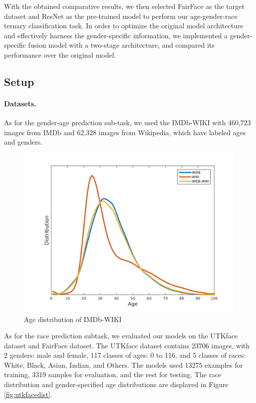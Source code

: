 \documentclass[DIV=calc, paper=a4, fontsize=10pt, twocolumn]{article}
\begin{document}
	
	With the obtained comparative results, we then selected FairFace as the target dataset and ResNet as the pre-trained model to perform our age-gender-race ternary classification task. In order to optimize the original model architecture and effectively harness the gender-specific information, we implemented a gender-specific fusion model with a two-stage architecture, and compared its performance over the original model.
	
	
	\subsection{Setup} \label{setup}
	
	\paragraph{Datasets.} As for the gender-age prediction sub-task, we used the IMDb-WIKI\cite{Rothe-IJCV-2018, Rothe-ICCVW-2015} with 460,723 images from IMDb and 62,328 images from Wikipedia, which have labeled ages and genders.
	
	\begin{figure}[H]
		\centering
		\includegraphics[width=0.7\linewidth]{imgs/screenshot001}
		\caption{Age distribution of IMDb-WIKI}
		\label{fig:screenshot001}
	\end{figure}
	
	As for the race prediction subtask, we evaluated our models on the UTKface\cite{zhifei2017cvpr} dataset and FairFace\cite{karkkainenfairface} dataset. The UTKface dataset contains 23706 images, with 2 genders: male and female, 117 classes of ages: 0 to 116, and 5 classes of races: White, Black, Asian, Indian, and Others. The models used 13275 examples for training, 3319 samples for evaluation, and the rest for testing. The race distribution and gender-specified age distributions are displayed in Figure \ref{fig:utkfacedist}. 
	
\end{document}
